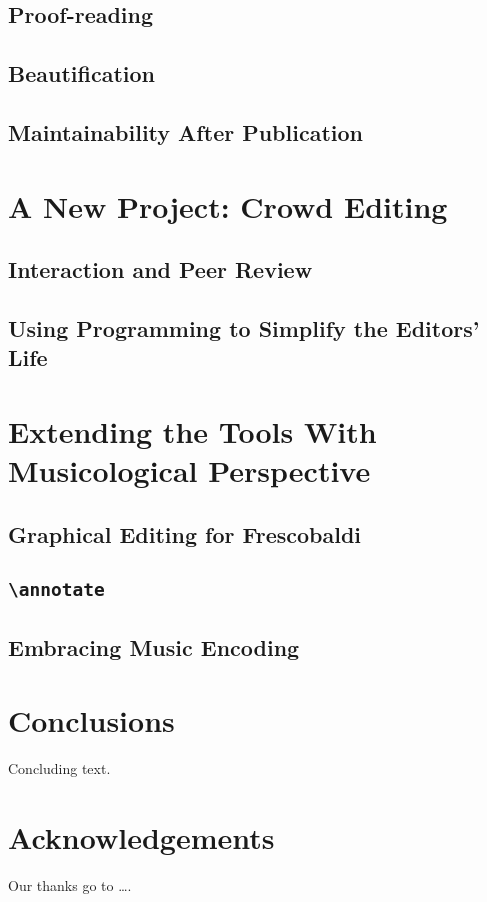 \documentclass[11pt,a4paper]{article}
\begin{document}
\subsection{Proof-reading}

\subsection{Beautification}

\subsection{Maintainability After Publication}


\section{A New Project: Crowd Editing}

\subsection{Interaction and Peer Review}

\subsection{Using Programming to Simplify the Editors' Life}


\section{Extending the Tools With Musicological Perspective}

\subsection{Graphical Editing for Frescobaldi}

\subsection{\texttt{\textbackslash annotate}}

\subsection{Embracing Music Encoding}


\section{Conclusions}

Concluding text.

\section{Acknowledgements}

Our thanks go to \ldots .
\end{document}
